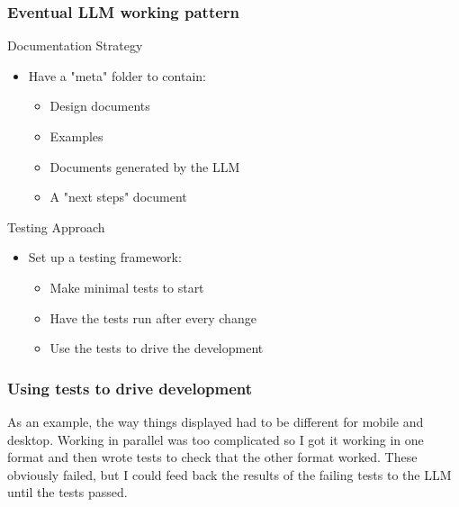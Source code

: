 \documentclass{beamer}
\begin{document}
\begin{frame}
    \frametitle{Eventual LLM working pattern}
    \begin{block}{Documentation Strategy}
        \begin{itemize}
            \item Have a "meta" folder to contain:
            \begin{itemize}
                \item Design documents
                \item Examples
                \item Documents generated by the LLM
                \item A "next steps" document
            \end{itemize}
        \end{itemize}
    \end{block}
    
    \begin{block}{Testing Approach}
        \begin{itemize}
            \item Set up a testing framework:
            \begin{itemize}
                \item Make minimal tests to start
                \item Have the tests run after every change
                \item Use the tests to drive the development
            \end{itemize}
        \end{itemize}
    \end{block}
\end{frame}

\begin{frame}
    \frametitle{Using tests to drive development}
    As an example, the way things displayed had to be different for mobile and desktop. Working in parallel was too complicated so I got it working in one format and then wrote tests to check that the other format worked. These obviously failed, but I could feed back the results of the failing tests to the LLM until the tests passed.
\end{frame}
\end{document}
